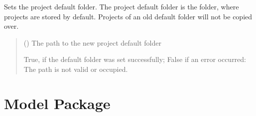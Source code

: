 \documentclass[letterpaper,10pt,english]{sphinxmanual}
\begin{document}
\begin{fulllineitems}
\begin{fulllineitems}
\begin{quote}
\begin{description}
\sphinxAtStartPar
{}

\end{description}\end{quote}

\end{fulllineitems}


\begin{fulllineitems}
\label{\detokenize{apidoc/src.osm_configurator.control:src.osm_configurator.control.settings_controller.SettingsController.set_project_default_folder}}
\pysigstartsignatures
{}
\pysigstopsignatures
\sphinxAtStartPar
Sets the project default folder.
The project default folder is the folder, where projects are stored by default.
Projects of an old default folder will not be copied over.
\begin{quote}\begin{description}
\sphinxAtStartPar
{} () \textendash{} The path to the new project default folder

\sphinxAtStartPar
True, if the default folder was set successfully; False if an error occurred: The path is not valid or occupied.

\sphinxAtStartPar
{}

\end{description}\end{quote}

\end{fulllineitems}


\end{fulllineitems}



\section{Model Package}
\end{document}
